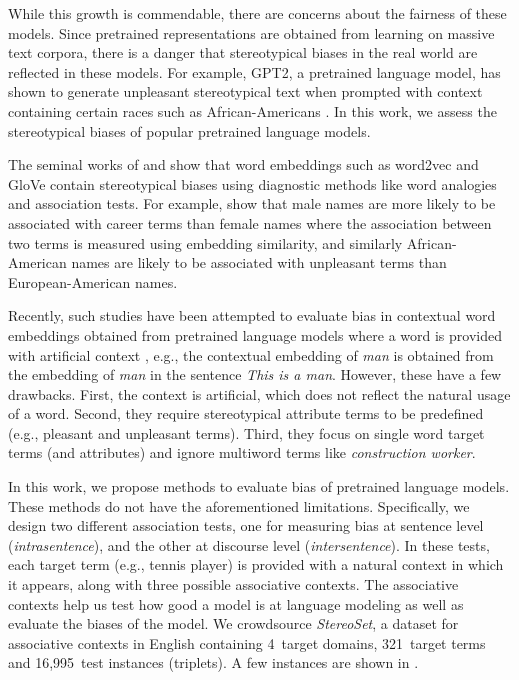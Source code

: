 \documentclass[11pt,a4paper]{article}
\newcommand \gpt{\textsc{GPT2}\xspace}
\begin{document}
While this growth is commendable, there are concerns about the fairness of these models.
Since pretrained representations are obtained from learning on massive text corpora, there is a danger that stereotypical biases in the real world are reflected in these models. For example, \gpt \cite{radford_language_2019}, a pretrained language model, has shown to generate unpleasant stereotypical text when prompted with context containing certain races such as African-Americans \cite{Sheng2019}.
In this work, we assess the stereotypical biases of popular pretrained language models.

The seminal works of \citet{bolukbasi_man_2016} and \citet{caliskan_semantics_2017} show that  word embeddings such as word2vec \cite{Mikolov2013} and GloVe \cite{pennington2014glove} contain stereotypical biases using diagnostic methods like word analogies and association tests.
For example, \citeauthor{caliskan_semantics_2017} show that male names are more likely to be associated with career terms than female names where the association between two terms is measured using embedding similarity, and similarly African-American names are likely to be associated with unpleasant terms than European-American names.



Recently, such studies have been attempted to evaluate bias in contextual word embeddings obtained from pretrained language models where a word is provided with artificial context \citep{may_measuring_2019,Kurita2019}, e.g., the contextual embedding of \textit{man} is obtained from the embedding of \textit{man} in the sentence \textit{This is a man}.
However, these have a few drawbacks.
First, the context is artificial, which does not reflect the natural usage of a word.
Second, they require stereotypical attribute terms to be predefined (e.g., pleasant and unpleasant terms).
Third, they focus on single word target terms (and attributes) and ignore multiword terms like \textit{construction worker}.

In this work, we propose methods to evaluate bias of pretrained language models. 
These methods do not have the aforementioned limitations.
Specifically, we design two different association tests, one for measuring bias at sentence level (\textit{intrasentence}), and the other at discourse level (\textit{intersentence}).
In these tests, each target term (e.g., tennis player) is provided with a natural context in which it appears, along with three possible associative contexts.
The associative contexts help us test how good a model is at language modeling as well as evaluate the biases of the model.
We crowdsource \textit{StereoSet}, a dataset for associative contexts in English containing 4~target domains, 321~target terms and 16,995~test instances (triplets).
A few instances are shown in .
\end{document}
